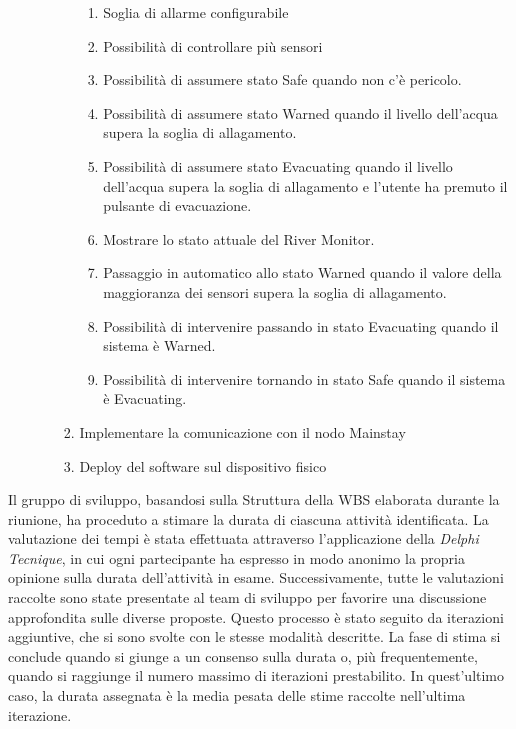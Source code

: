 \begin{enumerate}
\begin{enumerate}
\begin{enumerate}
                              \begin{enumerate}
                                  \item Soglia di allarme configurabile
                                  \item Possibilità di controllare più sensori
                                  \item Possibilità di assumere stato Safe quando non c'è pericolo.
                                  \item Possibilità di assumere stato Warned quando il livello dell'acqua supera la soglia di allagamento.
                                  \item Possibilità di assumere stato Evacuating quando il livello dell'acqua supera la soglia di allagamento e l'utente ha premuto il pulsante di evacuazione.
                                  \item Mostrare lo stato attuale del River Monitor.
                                  \item Passaggio in automatico allo stato Warned quando il valore della maggioranza dei sensori supera la soglia di allagamento.
                                  \item Possibilità di intervenire passando in stato Evacuating quando il sistema è Warned.
                                  \item Possibilità di intervenire tornando in stato Safe quando il sistema è Evacuating.
                              \end{enumerate}
                        \item Implementare la comunicazione con il nodo Mainstay
                        \item Deploy del software sul dispositivo fisico
                    \end{enumerate}
          \end{enumerate}
\end{enumerate}

Il gruppo di sviluppo, basandosi sulla Struttura della WBS elaborata durante la riunione, ha proceduto a stimare la durata di ciascuna attività identificata. La valutazione dei tempi è stata effettuata attraverso l'applicazione della \textit{Delphi Tecnique}, in cui ogni partecipante ha espresso in modo anonimo la propria opinione sulla durata dell'attività in esame. Successivamente, tutte le valutazioni raccolte sono state presentate al team di sviluppo per favorire una discussione approfondita sulle diverse proposte. Questo processo è stato seguito da iterazioni aggiuntive, che si sono svolte con le stesse modalità descritte. La fase di stima si conclude quando si giunge a un consenso sulla durata o, più frequentemente, quando si raggiunge il numero massimo di iterazioni prestabilito. In quest'ultimo caso, la durata assegnata è la media pesata delle stime raccolte nell'ultima iterazione.

